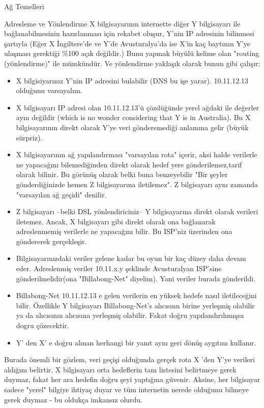 \begin{section}{Ağ Temelleri}
\begin{subsection}{Adresleme ve Yönlendirme}
X bilgisayarının internette diğer Y bilgisayarı ile bağlanabilmesinin hazırlanması için rekabet oluşur, Y'nin IP adresinin bilinmesi şartıyla (Eğer X İngiltere'de ve Y'de Avusturalya'da ise X'in kaç baytının Y'ye ulaşması gerektiği \%100 açık değildir.) Bunu yapmak büyülü kelime olan "routing (yönlendirme)" ile mümkündür. Ve yönlendirme yaklaşık olarak bunun gibi çalışır:
\begin{itemize}
\item X bilgisiyarınız Y'nin IP adresini bulabilir (DNS bu işe yarar). 10.11.12.13 olduğunu varsayalım.
\item X bilgisayarı IP adresi olan 10.11.12.13'ü çözdüğünde yerel ağdaki ile değerler aynı değildir (which is no wonder considering that Y is in
Australia). Bu X bilgisayarının direkt olarak Y'ye veri gönderemediği anlamına gelir (büyük sürpriz).
\item X bilgisayarının ağ yapılandırması "varsayılan rota" içerir, aksi halde verilerle ne yapacağını bilemediğinden direkt olarak hedef yere gönderilemez,tarif olarak bilinir. Bu görünüş olarak belki buna benzeyebilir "Bir şeyler gönderdiğinizde hemen Z bilgisayarına iletilemez". Z bilgisayarı aynı zamanda "varsayılan ağ geçidi" denilir.
\item Z bilgisayarı --belki DSL yönlendiriciniz-- Y bilgisayarına direkt olarak verileri iletemez. Ancak, X bilgisayarı gibi direkt olarak ona bağlanarak adreslenmemiş verilerle ne yapacağını bilir. Bu ISP'niz üzerinden ona göndererek gerçekleşir.
\item Bilgisayarınızdaki veriler gelene kadar bu oyun bir kaç düzey daha devam eder. Adreslenmiş veriler 10.11.x.y şeklinde  Avusturalyan ISP'sine gönderilmelidir(ona "Billabong-Net" diyelim). Yani veriler burada gönderildi.
\item Billabong-Net 10.11.12.13 e gelen verilerin en yüksek hedefe nasıl iletileceğini bilir. Özellikle Y bilgisayarı Billabong-Net's alıcısınn birine yerleşmiş olabilir ya da alıcısının alıcısına yerleşmiş olabilir. Fakat doğru yapılandırılımışsa dogru çözecektir.
\item Y' den X' e doğru alınan herhangi bir yanıt aynı geri dönüş aygıtını kullanır.
\end{itemize}

Burada önemli bir gözlem, veri geçişi olduğunda gerçek rota X 'den Y'ye verileri aldığını belirtir. X bilgisayarı orta hedeflerin tam listesini belirtmeye gerek duymaz, fakat her ara hedefin doğru şeyi yaptığına güvenir. Aksine, her bilgisayar sadece "yerel" bilgiye ihtiyaç duyar ve tüm internetin nerede olduğunu bilmeye gerek duymaz - bu oldukça imkansız olurdu.


\end{subsection}
\end{section}
